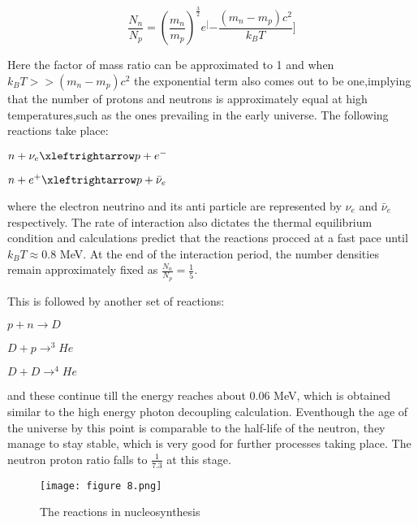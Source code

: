 \begin{equation}
    \frac{N_n}{N_p} = (\frac{m_n}{m_p})^{\frac{3}{2}}e^[{-\frac{(m_n-m_p)c^2}{k_{B}T}]}
\end{equation}

Here the factor of mass ratio can be approximated to 1 and when $k_{B}T >> (m_n-m_p)c^2$ the exponential term also comes out to be one,implying that the number of protons and neutrons is approximately equal at high temperatures,such as the ones prevailing in the early universe.
The following reactions take place:

\begin{center}
    $n + \nu_{e} \xleftrightarrow p + e^{-}$
\end{center}

\begin{center}
    $n + e^{+} \xleftrightarrow p + {\bar{\nu}_{e}}$
\end{center}

where the electron neutrino and its anti particle are represented by $\nu_{e}$ and ${\bar{\nu}_{e}}$ respectively. The rate of interaction also dictates the thermal equilibrium condition and calculations predict that the reactions procced at a fast pace until $k_{B}T \approx 0.8$ MeV. At the end of the interaction period, the number densities remain approximately fixed as $\frac{N_n}{N_p} = \frac{1}{5}$.

This is followed by another set of reactions: 

\begin{center}
    $p + n \rightarrow D$
\end{center}

\begin{center}
    $D + p \rightarrow ^{3}He$
\end{center}

\begin{center}
    $D + D \rightarrow ^{4}He$
\end{center}

and these continue till the energy reaches about 0.06 MeV, which is obtained similar to the high energy photon decoupling calculation. Eventhough the age of the universe by this point is comparable to the half-life of the neutron, they manage to stay stable, which is very good for further processes taking place. The neutron proton ratio falls to $\frac{1}{7.3}$ at this stage.

\begin{figure}[H]
    \centering
    \texttt{[image: figure 8.png]}
    \caption{The reactions in nucleosynthesis}
    \label{fig:nsyn}
\end{figure}

